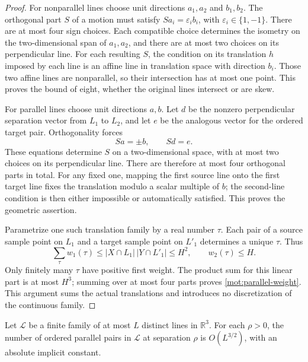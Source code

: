 \begin{proof}
For nonparallel lines choose unit directions \(a_1,a_2\) and
\(b_1,b_2\).  The orthogonal part \(S\) of a motion must satisfy
\(Sa_i=\varepsilon_i b_i\), with
\(\varepsilon_i\in\{1,-1\}\).  There are at most four sign
choices.  Each compatible choice determines the isometry on the
two-dimensional span of \(a_1,a_2\), and there are at most two
choices on its perpendicular line.  For each resulting \(S\),
the condition on its translation \(h\) imposed by each line is
an affine line in translation space with direction \(b_i\).
Those two affine lines are nonparallel, so their intersection
has at most one point.  This proves the bound of eight, whether
the original lines intersect or are skew.

For parallel lines choose unit directions \(a,b\).  Let \(d\)
be the nonzero perpendicular separation vector from \(L_1\) to
\(L_2\), and let \(e\) be the analogous vector for the ordered
target pair.  Orthogonality forces
\[
 Sa=\pm b,\qquad Sd=e.
\]
These equations determine \(S\) on a two-dimensional space,
with at most two choices on its perpendicular line.  There are
therefore at most four orthogonal parts in total.  For any fixed
one, mapping the first source line onto the first target line
fixes the translation modulo a scalar multiple of \(b\); the
second-line condition is then either impossible or automatically
satisfied.  This proves the geometric assertion.

Parametrize one such translation family by a real number \(\tau\).
Each pair of a source sample point on \(L_1\) and a target sample
point on \(L'_1\) determines a unique \(\tau\).  Thus
\[
 \sum_\tau w_1(\tau)
 \le |X\cap L_1|\,|Y\cap L'_1|\le H^2,
 \qquad w_2(\tau)\le H.
\]
Only finitely many \(\tau\) have positive first weight.  The
product sum for this linear part is at most \(H^3\); summing over
at most four parts proves \eqref{mot:parallel-weight}.  This
argument sums the actual translations and introduces no
discretization of the continuous family.
\end{proof}

\begin{lemma}
\label{mot:parallel-pairs}
Let \(\mathcal L\) be a finite family of at most \(L\) distinct
lines in \(\mathbb R^3\).  For each \(\rho>0\), the number of
ordered parallel pairs in \(\mathcal L\) at separation \(\rho\)
is \(O(L^{3/2})\), with an absolute implicit constant.
\end{lemma}


